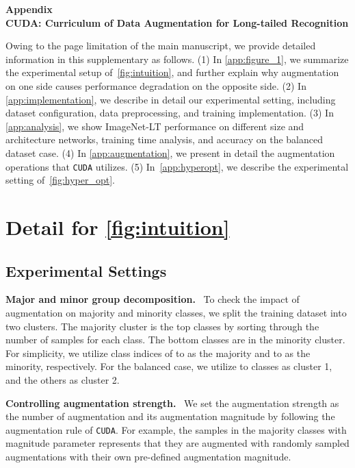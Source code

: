 \documentclass{article}
\newcommand{\myparagraph}[1]{\vspace{0.07cm}\noindent\textbf{#1}~}
\def\code#1{\texttt{#1}}
\newcommand{\alg}{\code{CUDA}\xspace}
\begin{document}
\appendix
\newpage

\begin{center}
    \textbf{\Large{Appendix\\}}
    \textbf{\large{CUDA: Curriculum of Data Augmentation for Long-tailed Recognition}}
\end{center}

Owing to the page limitation of the main manuscript, we provide detailed information in this supplementary as follows. (1) In \autoref{app:figure_1}, we summarize the experimental setup of~\autoref{fig:intuition}, and further explain why augmentation on one side causes performance degradation on the opposite side. (2) In \autoref{app:implementation}, we describe in detail our experimental setting, including dataset configuration, data preprocessing, and training implementation. (3) In \autoref{app:analysis}, we show ImageNet-LT performance on different size and architecture networks, training time analysis, and accuracy on the balanced dataset case. (4) In \autoref{app:augmentation}, we present in detail the augmentation operations that \alg utilizes. (5) In~\autoref{app:hyperopt}, we describe the experimental setting of~\autoref{fig:hyper_opt}.

\section{Detail for \autoref{fig:intuition}}
\label{app:figure_1}
\subsection{Experimental Settings}
\myparagraph{Major and minor group decomposition.}
To check the impact of augmentation on majority and minority classes, we split the training dataset into two clusters. The majority cluster is the top  classes by sorting through the number of samples for each class. The bottom  classes are in the minority cluster. For simplicity, we utilize class indices of  to  as the majority and  to  as the minority, respectively. For the balanced case, we utilize  to  classes as cluster 1, and the others as cluster 2.

\myparagraph{Controlling augmentation strength.}
We set the augmentation strength as the number of augmentation and its augmentation magnitude by following the augmentation rule of \alg. For example, the samples in the majority classes with magnitude parameter  represents that they are augmented with randomly sampled  augmentations with their own pre-defined augmentation magnitude.
\end{document}
